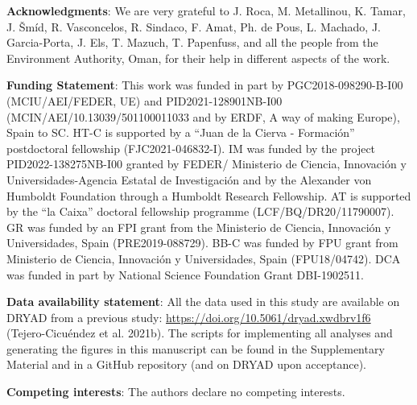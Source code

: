 \documentclass[
  11pt,
]{article}
\begin{document}
\newpage

\hfill\break

\textbf{Acknowledgments}: We are very grateful to J. Roca, M.
Metallinou, K. Tamar, J. Šmíd, R. Vasconcelos, R. Sindaco, F. Amat, Ph.
de Pous, L. Machado, J. Garcia-Porta, J. Els, T. Mazuch, T. Papenfuss,
and all the people from the Environment Authority, Oman, for their help
in different aspects of the work.

\textbf{Funding Statement}: This work was funded in part by
PGC2018-098290-B-I00 (MCIU/AEI/FEDER, UE) and PID2021-128901NB-I00
(MCIN/AEI/10.13039/501100011033 and by ERDF, A way of making Europe),
Spain to SC. HT-C is supported by a ``Juan de la Cierva - Formación''
postdoctoral fellowship (FJC2021-046832-I). IM was funded by the project
PID2022-138275NB-I00 granted by FEDER/ Ministerio de Ciencia, Innovación
y Universidades-Agencia Estatal de Investigación and by the Alexander
von Humboldt Foundation through a Humboldt Research Fellowship. AT is
supported by the ``la Caixa'' doctoral fellowship programme
(LCF/BQ/DR20/11790007). GR was funded by an FPI grant from the
Ministerio de Ciencia, Innovación y Universidades, Spain
(PRE2019-088729). BB-C was funded by FPU grant from Ministerio de
Ciencia, Innovación y Universidades, Spain (FPU18/04742). DCA was funded
in part by National Science Foundation Grant DBI-1902511.

\textbf{Data availability statement}: All the data used in this study
are available on DRYAD from a previous study:
\url{https://doi.org/10.5061/dryad.xwdbrv1f6} (Tejero-Cicuéndez et al.
2021b). The scripts for implementing all analyses and generating the
figures in this manuscript can be found in the Supplementary Material
and in a GitHub repository (and on DRYAD upon acceptance).

\textbf{Competing interests}: The authors declare no competing
interests.
\end{document}
